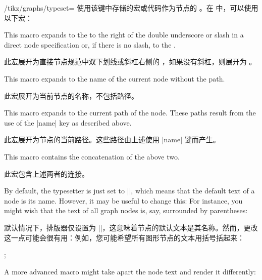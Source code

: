 \begin{itemize}
\begin{key}{/tikz/graphs/typeset=}
            使用该键中存储的宏或代码作为节点的 。在  中，可以使用以下宏：
            \begin{command}{\tikzgraphnodetext}
                This macro expands to the  to the right of the
                double underscore or slash in a direct node specification or,
                if there is no slash, to the .

                此宏展开为直接节点规范中双下划线或斜杠右侧的 ，如果没有斜杠，则展开为 。
            \end{command}
            \begin{command}{\tikzgraphnodename}
                This macro expands to the name of the current node without the
                path.

                此宏展开为当前节点的名称，不包括路径。
            \end{command}
            \begin{command}{\tikzgraphnodepath}
                This macro expands to the current path of the node. These paths
                result from the use of the |name| key as described above.

                此宏展开为节点的当前路径。这些路径由上述使用 |name| 键而产生。
            \end{command}
            \begin{command}{\tikzgraphnodefullname}
                This macro contains the concatenation of the above two.

                此宏包含上述两者的连接。
            \end{command}
        \end{key}
        By default, the typesetter is just set to |\tikzgraphnodetext|, which
        means that the default text of a node is its name. However, it may be
        useful to change this: For instance, you might wish that the text of
        all graph nodes is, say, surrounded by parentheses:
        
        默认情况下，排版器仅设置为 |\tikzgraphnodetext|，这意味着节点的默认文本是其名称。然而，更改这一点可能会很有用：例如，您可能希望所有图形节点的文本用括号括起来：
\begin{codeexample}[preamble={\usetikzlibrary{graphs}}]
\tikz {};
\end{codeexample}
        A more advanced macro might take apart the node text and render it
        differently:
        

\end{itemize}
